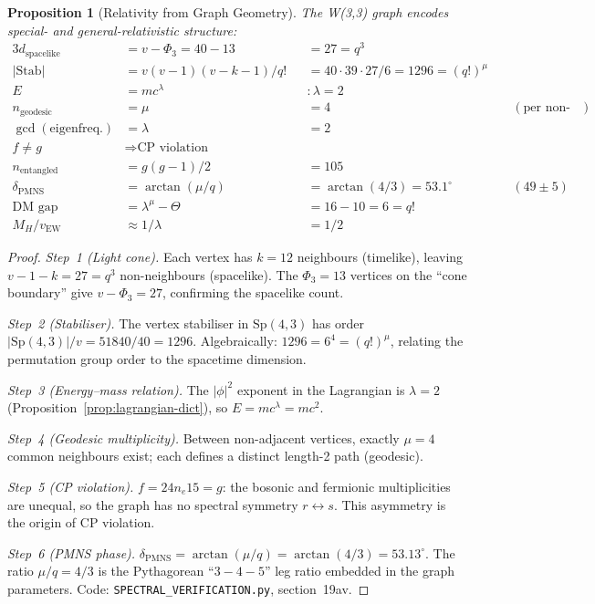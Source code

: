 \documentclass[12pt,a4paper]{article}
\newtheorem{proposition}[theorem]{Proposition}
\renewcommand{\ne}{n_{\!e}}
\begin{document}
\begin{proposition}[Relativity from Graph Geometry]\label{prop:relativity}
The W(3,3) graph encodes special- and general-relativistic structure:
\begin{alignat*}{3}
  d_{\mathrm{spacelike}} &= v - \Phi_3 = 40 - 13 &&= 27 = q^3
    &\;& \\
  |\mathrm{Stab}| &= v(v{-}1)(v{-}k{-}1)/q! &&= 40\cdot39\cdot27/6
    = 1296 = (q!)^\mu &\;& \\
  E &= mc^\lambda &&\colon \lambda = 2 && \\
  n_{\mathrm{geodesic}} &= \mu &&= 4 && (\text{per non-adj.\ pair}) \\
  \gcd(\text{eigenfreq.}) &= \lambda &&= 2 && \\
  f \neq g &\Rightarrow \text{CP violation} && && \\
  n_{\mathrm{entangled}} &= g(g{-}1)/2 &&= 105 && \\
  \delta_{\mathrm{PMNS}} &= \arctan(\mu/q) &&= \arctan(4/3) = 53.1^\circ
    &\;& (49\pm5) \\
  \text{DM gap} &= \lambda^\mu - \Theta &&= 16 - 10 = 6 = q! && \\
  M_H/v_{\mathrm{EW}} &\approx 1/\lambda &&= 1/2 &&
\end{alignat*}
\end{proposition}

\begin{proof}
\emph{Step~1 (Light cone).}
Each vertex has $k = 12$ neighbours (timelike), leaving
$v - 1 - k = 27 = q^3$ non-neighbours (spacelike).
The $\Phi_3 = 13$ vertices on the ``cone boundary'' give
$v - \Phi_3 = 27$, confirming the spacelike count.

\emph{Step~2 (Stabiliser).}
The vertex stabiliser in $\mathrm{Sp}(4,3)$ has order
$|\mathrm{Sp}(4,3)|/v = 51840/40 = 1296$.
Algebraically: $1296 = 6^4 = (q!)^\mu$,
relating the permutation group order to the spacetime dimension.

\emph{Step~3 (Energy--mass relation).}
The $|\phi|^2$ exponent in the Lagrangian is $\lambda = 2$
(Proposition~\ref{prop:lagrangian-dict}), so $E = mc^\lambda = mc^2$.

\emph{Step~4 (Geodesic multiplicity).}
Between non-adjacent vertices, exactly $\mu = 4$ common neighbours
exist; each defines a distinct length-2 path (geodesic).

\emph{Step~5 (CP violation).}
$f = 24 \ne 15 = g$: the bosonic and fermionic multiplicities
are unequal, so the graph has no spectral symmetry $r \leftrightarrow s$.
This asymmetry is the origin of CP violation.

\emph{Step~6 (PMNS phase).}
$\delta_{\mathrm{PMNS}} = \arctan(\mu/q) = \arctan(4/3) = 53.13^\circ$.
The ratio $\mu/q = 4/3$ is the Pythagorean ``$3{-}4{-}5$'' leg ratio
embedded in the graph parameters.
Code: \texttt{SPECTRAL\_VERIFICATION.py}, section~19av.
\end{proof}
\end{document}
